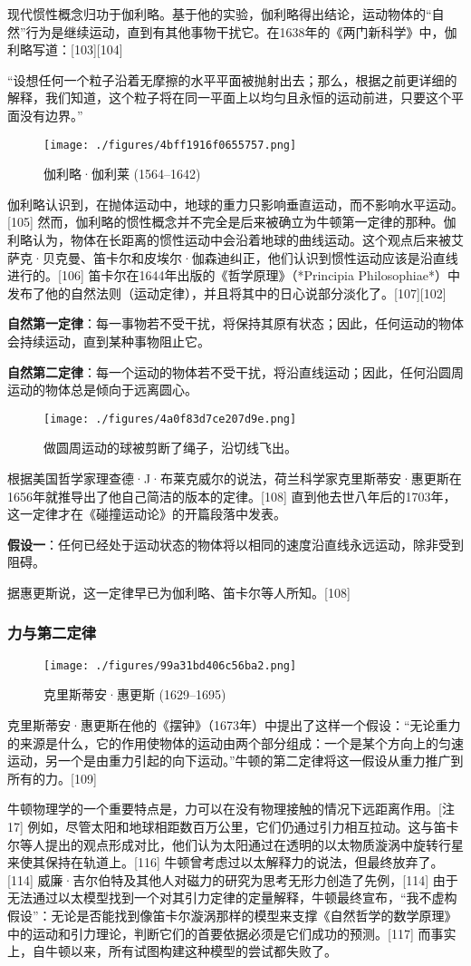 现代惯性概念归功于伽利略。基于他的实验，伽利略得出结论，运动物体的“自然”行为是继续运动，直到有其他事物干扰它。在1638年的《两门新科学》中，伽利略写道：[103][104]

“设想任何一个粒子沿着无摩擦的水平平面被抛射出去；那么，根据之前更详细的解释，我们知道，这个粒子将在同一平面上以均匀且永恒的运动前进，只要这个平面没有边界。” 
\begin{figure}[ht]
\centering
\texttt{[image: ./figures/4bff1916f0655757.png]}
\caption{伽利略·伽利莱   (1564–1642)} \label{fig_NEW01_18}
\end{figure}
伽利略认识到，在抛体运动中，地球的重力只影响垂直运动，而不影响水平运动。[105] 然而，伽利略的惯性概念并不完全是后来被确立为牛顿第一定律的那种。伽利略认为，物体在长距离的惯性运动中会沿着地球的曲线运动。这个观点后来被艾萨克·贝克曼、笛卡尔和皮埃尔·伽森迪纠正，他们认识到惯性运动应该是沿直线进行的。[106] 笛卡尔在1644年出版的《哲学原理》（*Principia Philosophiae*）中发布了他的自然法则（运动定律），并且将其中的日心说部分淡化了。[107][102]

\textbf{自然第一定律}：每一事物若不受干扰，将保持其原有状态；因此，任何运动的物体会持续运动，直到某种事物阻止它。

\textbf{自然第二定律}：每一个运动的物体若不受干扰，将沿直线运动；因此，任何沿圆周运动的物体总是倾向于远离圆心。
\begin{figure}[ht]
\centering
\texttt{[image: ./figures/4a0f83d7ce207d9e.png]}
\caption{做圆周运动的球被剪断了绳子，沿切线飞出。} \label{fig_NEW01_20}
\end{figure}
根据美国哲学家理查德·J·布莱克威尔的说法，荷兰科学家克里斯蒂安·惠更斯在1656年就推导出了他自己简洁的版本的定律。[108] 直到他去世八年后的1703年，这一定律才在《碰撞运动论》的开篇段落中发表。

\textbf{假设一}：任何已经处于运动状态的物体将以相同的速度沿直线永远运动，除非受到阻碍。

据惠更斯说，这一定律早已为伽利略、笛卡尔等人所知。[108]
\subsubsection{力与第二定律}
\begin{figure}[ht]
\centering
\texttt{[image: ./figures/99a31bd406c56ba2.png]}
\caption{克里斯蒂安·惠更斯   (1629–1695)} \label{fig_NEW01_21}
\end{figure}
克里斯蒂安·惠更斯在他的《摆钟》（1673年）中提出了这样一个假设：“无论重力的来源是什么，它的作用使物体的运动由两个部分组成：一个是某个方向上的匀速运动，另一个是由重力引起的向下运动。”牛顿的第二定律将这一假设从重力推广到所有的力。[109]

牛顿物理学的一个重要特点是，力可以在没有物理接触的情况下远距离作用。[注17] 例如，尽管太阳和地球相距数百万公里，它们仍通过引力相互拉动。这与笛卡尔等人提出的观点形成对比，他们认为太阳通过在透明的以太物质漩涡中旋转行星来使其保持在轨道上。[116] 牛顿曾考虑过以太解释力的说法，但最终放弃了。[114] 威廉·吉尔伯特及其他人对磁力的研究为思考无形力创造了先例，[114] 由于无法通过以太模型找到一个对其引力定律的定量解释，牛顿最终宣布，“我不虚构假设”：无论是否能找到像笛卡尔漩涡那样的模型来支撑《自然哲学的数学原理》中的运动和引力理论，判断它们的首要依据必须是它们成功的预测。[117] 而事实上，自牛顿以来，所有试图构建这种模型的尝试都失败了。